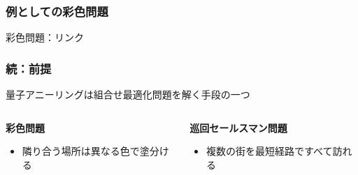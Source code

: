 \begin{frame}
  \frametitle{例としての彩色問題}
  彩色問題：リンク\\
\end{frame}


\begin{frame}
  \frametitle{続：前提}

  {\Large  量子アニーリングは組合せ最適化問題を解く手段の一つ}
  \vspace{5mm}

  \begin{columns}
    \begin{column}{0.45\textwidth}
      \textbf{彩色問題}
      \begin{itemize}
          \item 隣り合う場所は異なる色で塗分ける
      \end{itemize}
    \end{column}

    \begin{column}{0.45\textwidth}
      \textbf{巡回セールスマン問題}
      \begin{itemize}
          \item 複数の街を最短経路ですべて訪れる
      \end{itemize}
    \end{column}
  \end{columns}
  \vspace{10mm}
\end{frame}

